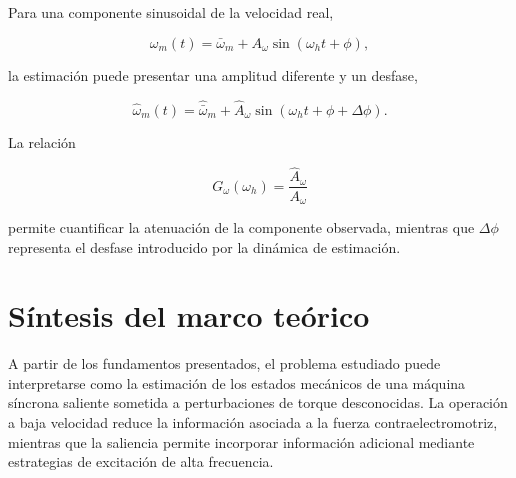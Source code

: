 Para una componente sinusoidal de la velocidad real,

\begin{equation}
\omega_m(t)
=
\bar{\omega}_m
+
A_{\omega}\sin(\omega_h t+\phi),
\end{equation}

la estimación puede presentar una amplitud diferente y un desfase,

\begin{equation}
\hat{\omega}_m(t)
=
\hat{\bar{\omega}}_m
+
\hat{A}_{\omega}
\sin(\omega_h t+\phi+\Delta\phi).
\end{equation}

La relación

\begin{equation}
G_{\omega}(\omega_h)
=
\frac{\hat{A}_{\omega}}{A_{\omega}}
\end{equation}

permite cuantificar la atenuación de la componente observada, mientras que 
$\Delta\phi$ representa el desfase introducido por la dinámica de estimación.

%
%
%
%
%



\section{Síntesis del marco teórico}

%
%
%

A partir de los fundamentos presentados, el problema estudiado puede 
interpretarse como la estimación de los estados mecánicos de una máquina 
síncrona saliente sometida a perturbaciones de torque desconocidas. La 
operación a baja velocidad reduce la información asociada a la fuerza 
contraelectromotriz, mientras que la saliencia permite incorporar información 
adicional mediante estrategias de excitación de alta frecuencia.

